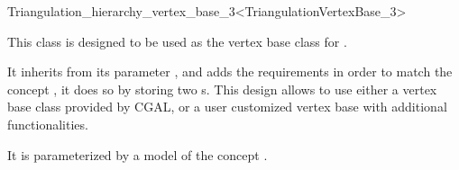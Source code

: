 

\begin{ccRefClass}{Triangulation_hierarchy_vertex_base_3<TriangulationVertexBase_3>}

\ccDefinition
  
This class is designed to be used as the vertex base class for
.

It inherits from its parameter , and adds the
requirements in order to match the concept
, it does so by storing two
s.  This design allows to use either a vertex base class
provided by CGAL, or a user customized vertex base with additional
functionalities.


\ccParameters

It is parameterized by a model of the concept .

\ccIsModel {}

\ccInheritsFrom {}


\ccSeeAlso
{}\\
\\

\end{ccRefClass}
